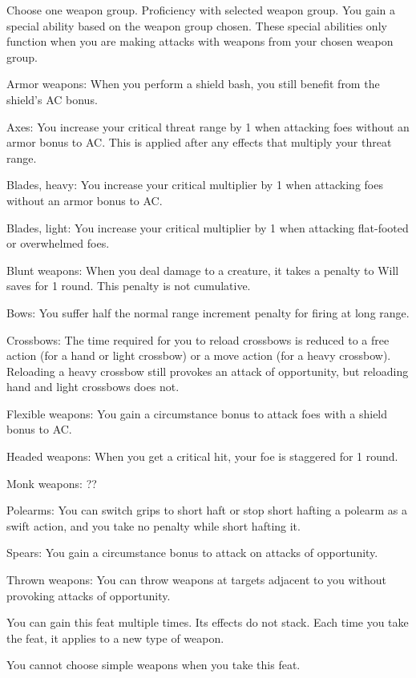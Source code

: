 Choose one weapon group.
 Proficiency with selected weapon group.
 You gain a special ability based on the weapon group chosen. These special abilities only function when you are making attacks with weapons from your chosen weapon group.
\begin{itemize*}
    \item Armor weapons: When you perform a shield bash, you still benefit from the shield's AC bonus.
    \item Axes: You increase your critical threat range by 1 when attacking foes without an armor bonus to AC. This is applied after any effects that multiply your threat range.
    \item Blades, heavy: You increase your critical multiplier by 1 when attacking foes without an armor bonus to AC.
    \item Blades, light: You increase your critical multiplier by 1 when attacking flat-footed or overwhelmed foes.
    \item Blunt weapons: When you deal damage to a creature, it takes a  penalty to Will saves for 1 round. This penalty is not cumulative.
    \item Bows: You suffer half the normal range increment penalty for firing at long range.
    \item Crossbows: The time required for you to reload crossbows is reduced to a free action (for a hand or light crossbow) or a move action (for a heavy crossbow). Reloading a heavy crossbow still provokes an attack of opportunity, but reloading hand and light crossbows does not.
    \item Flexible weapons: You gain a  circumstance bonus to attack foes with a shield bonus to AC.
    \item Headed weapons: When you get a critical hit, your foe is staggered for 1 round.
    \item Monk weapons: ??
    \item Polearms: You can switch grips to short haft or stop short hafting a polearm as a swift action, and you take no penalty while short hafting it.
    \item Spears: You gain a  circumstance bonus to attack on attacks of opportunity.
    \item Thrown weapons: You can throw weapons at targets adjacent to you without provoking attacks of opportunity.
\end{itemize*}
 You can gain this feat multiple times. Its effects do not stack. Each time you take the feat, it applies to a new type of weapon.
\par You cannot choose simple weapons when you take this feat.


